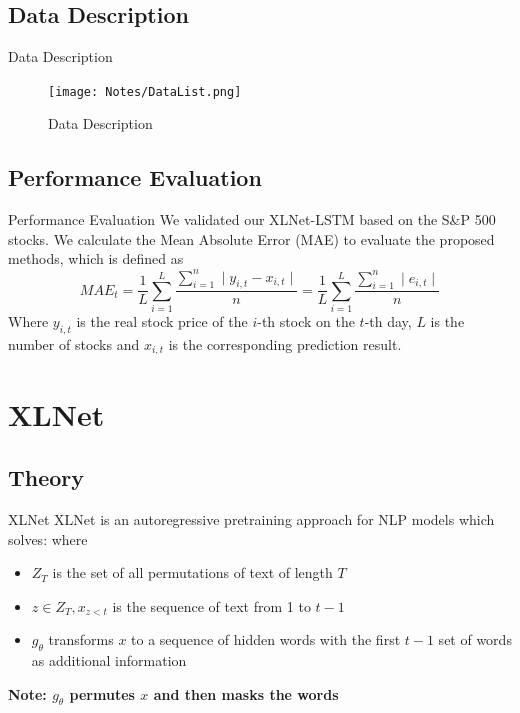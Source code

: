 \documentclass[14pt,aspectratio=169]{beamer}
\newcommand{\DAT}{Data Description}
\newcommand{\THE}{Theory}
\newcommand{\XL}{XLNet}
\newcommand{\PE}{Performance Evaluation}
\begin{document}
\subsection{\DAT}
\begin{frame}{\DAT}
\begin{figure}
    \centering
    \texttt{[image: Notes/DataList.png]}
    \caption{Data Description}
    \label{fig:my_label}
\end{figure}
\end{frame}

\subsection{\PE}
\begin{frame}{\PE}
We validated our XLNet-LSTM based on the S&P 500 stocks. We calculate the Mean Absolute Error (MAE) to evaluate the proposed methods, which is defined as
$$ MAE_{t} = \frac{1}{L} \sum_{i=1}^{L} \frac{\sum_{i=1}^{n} \mid y_{i, t} - x_{i, t} \mid }{n} = \frac{1}{L} \sum_{i=1}^{L} \frac{\sum_{i=1}^{n} \mid e_{i, t} \mid}{n}$$
Where $y_{i, t}$ is the real stock price of the $i$-th stock on the $t$-th day, $L$ is the number of stocks and $x_{i,t}$ is the corresponding prediction result. 
\end{frame}

\section{\XL}
\subsection{\THE}
\begin{frame}{\XL}
    XLNet is an autoregressive pretraining approach for NLP models which solves:  where \begin{itemize}
        \item $Z_{T}$ is the set of all permutations of text of length $T$ \\
        \item $z\in Z_{T}, x_{z<t}$ is the sequence of text from 1 to $t−1$ \\
        \item $g_{\theta}$ transforms $x$ to a sequence of hidden words with the first $t-1$ set of words as additional information
    \end{itemize}
    \textbf{Note: $g_{\theta}$ permutes $x$ and then masks the words}
\end{frame}
\end{document}
